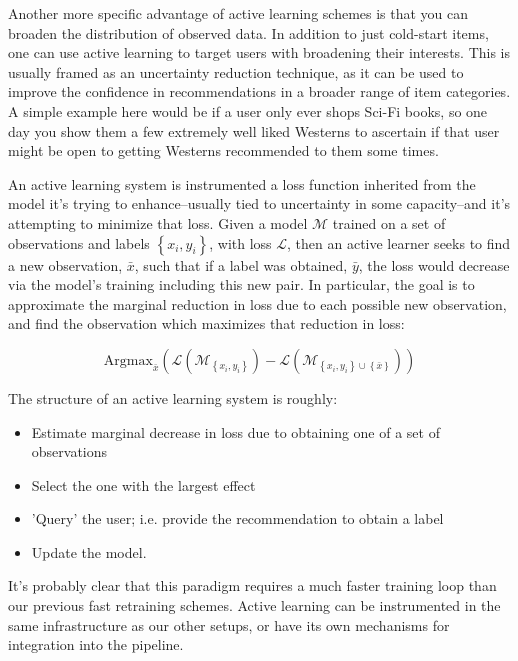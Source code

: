 Another more specific advantage of active learning schemes is that you can broaden the distribution of observed data. In addition to just cold-start items, one can use active learning to target users with broadening their interests. This is usually framed as an uncertainty reduction technique, as it can be used to improve the confidence in recommendations in a broader range of item categories. A simple example here would be if a user only ever shops Sci-Fi books, so one day you show them a few extremely well liked Westerns to ascertain if that user might be open to getting Westerns recommended to them some times.

An active learning system is instrumented a loss function inherited from the model it's trying to enhance–usually tied to uncertainty in some capacity–and it's attempting to minimize that loss. Given a model $\mathcal{M}$ trained on a set of observations and labels $\left\lbrace x_i,y_i \right\rbrace$, with loss $\mathcal{L}$, then an active learner seeks to find a new observation, $\bar{x}$, such that if a label was obtained, $\bar{y}$, the loss would decrease via the model's training including this new pair. In particular, the goal is to approximate the marginal reduction in loss due to each possible new observation, and find the observation which maximizes that reduction in loss:

\begin{equation}
\textrm{Argmax}_{\bar{x}} \left( \mathcal{L}\left(\mathcal{M}_{\left\lbrace x_i,y_i \right\rbrace}\right) - \mathcal{L}\left(\mathcal{M}_{\left\lbrace x_i,y_i \right\rbrace \cup \left\lbrace \bar{x} \right\rbrace}\right)\right)
\end{equation}

 The structure of an active learning system is roughly:

\begin{itemize}
\item Estimate marginal decrease in loss due to obtaining one of a set of observations
\item Select the one with the largest effect
\item 'Query' the user; i.e. provide the recommendation to obtain a label
\item Update the model.
\end{itemize}

It's probably clear that this paradigm requires a much faster training loop than our previous fast retraining schemes. Active learning can be instrumented in the same infrastructure as our other setups, or have its own mechanisms for integration into the pipeline. 

